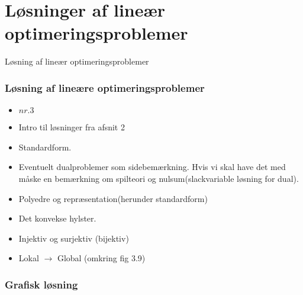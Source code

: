 \section{Løsninger af lineær optimeringsproblemer}
%
\begin{frame}
\centering
\Huge
Løsning af lineær optimeringsproblemer 
\end{frame}
%
\begin{frame}
\frametitle{Løsning af lineære optimeringsproblemer}
\begin{itemize}
\item \textbf{$nr. 3$}
\item Intro til løsninger fra afsnit 2
\item Standardform.
\item Eventuelt dualproblemer som sidebemærkning. Hvis vi skal have det med måske en bemærkning om spilteori og nulsum(slackvariable løsning for dual).
\item Polyedre og repræsentation(herunder standardform)
\item Det konvekse hylster.
\item Injektiv og surjektiv (bijektiv)
\item Lokal $\rightarrow$ Global (omkring fig 3.9)
\end{itemize}
\end{frame}

\begin{frame}
\frametitle{Grafisk løsning}

\end{frame}

%
%
%
%
